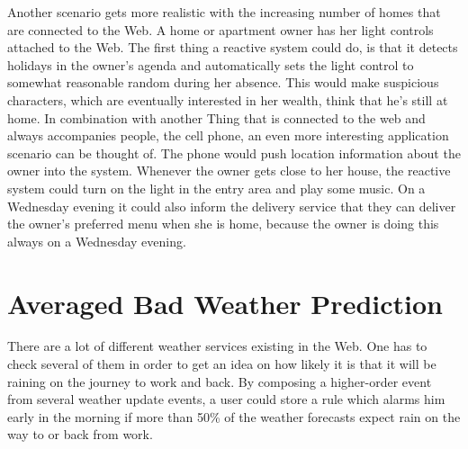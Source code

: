 Another scenario gets more realistic with the increasing number of homes that are connected to the Web.
A home or apartment owner has her light controls attached to the Web.
The first thing a reactive system could do, is that it detects holidays in the owner's agenda and automatically sets the light control to somewhat reasonable random during her absence.
This would make suspicious characters, which are eventually interested in her wealth, think that he's still at home.
In combination with another \textrm{Thing} that is connected to the \textrm{\gls{web}} and always accompanies people, the cell phone, an even more interesting application scenario can be thought of.
The phone would push location information about the owner into the system.
Whenever the owner gets close to her house, the reactive system could turn on the light in the entry area and play some music.
On a Wednesday evening it could also inform the delivery service that they can deliver the owner's preferred menu when she is home, because the owner is doing this always on a Wednesday evening.



\section{Averaged Bad Weather Prediction}
There are a lot of different weather services existing in the Web.
One has to check several of them in order to get an idea on how likely it is that it will be raining on the journey to work and back.
By composing a higher-order event from several weather update events, a user could store a rule which alarms him early in the morning if more than 50\% of the weather forecasts expect rain on the way to or back from work.
